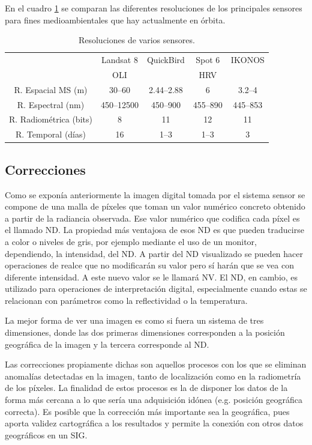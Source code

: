 En el cuadro \ref{tab:resoluciones} se comparan las diferentes resoluciones de los principales sensores para fines medioambientales que hay actualmente en órbita.

\begin{table}[ht]
	\centering
	\caption[Resoluciones de varios sensores]{Resoluciones de varios sensores.}
	\begin{tabular}{|c|c|c|c|c|}
	\hline
	& Landsat 8 & QuickBird & Spot 6 & IKONOS \\
	& OLI & & HRV & \\
	\hline
	R. Espacial MS (m) & 30--60 & 2.44--2.88 & 6 & 3.2--4 \\
	\hline
	R. Espectral (nm) & 450--12500 & 450--900 & 455--890 & 445--853 \\
	\hline
	R. Radiométrica (bits) & 8 & 11 & 12 & 11 \\
	\hline
	R. Temporal (días) & 16 & 1--3 & 1--3 & 3 \\
	\hline
	\end{tabular}
	\label{tab:resoluciones}
\end{table}

\subsection{Correcciones}
Como se exponía anteriormente la imagen digital tomada por el sistema sensor se compone de una malla de píxeles que toman un valor numérico concreto obtenido a partir de la radiancia observada. Ese valor numérico que codifica cada píxel es el llamado \ac{ND}. La propiedad más ventajosa de esos \ac{ND} es que pueden traducirse a color o niveles de gris, por ejemplo mediante el uso de un monitor, dependiendo, la intensidad, del \ac{ND}. A partir del \ac{ND} visualizado se pueden hacer operaciones de realce que no modificarán su valor pero sí harán que se vea con diferente intensidad. A este nuevo valor se le llamará \ac{NV}. El \ac{ND}, en cambio, es utilizado para operaciones de interpretación digital, especialmente cuando estas se relacionan con parámetros como la reflectividad o la temperatura.\Sep

La mejor forma de ver una imagen es como si fuera un sistema de tres dimensiones, donde las dos primeras dimensiones corresponden a la posición geográfica de la imagen y la tercera corresponde al \ac{ND}.\Sep

Las correcciones propiamente dichas son aquellos procesos con los que se eliminan anomalías detectadas en la imagen, tanto de localización como en la radiometría de los píxeles. La finalidad de estos procesos es la de disponer los datos de la forma más cercana a lo que sería una adquisición idónea (e.g. posición geográfica correcta). Es posible que la corrección más importante sea la geográfica, pues aporta validez cartográfica a los resultados y permite la conexión con otros datos geográficos en un \ac{SIG}.\Sep

